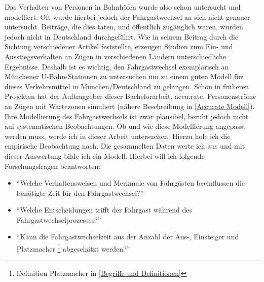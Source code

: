 Das Verhalten von Personen in Bahnhöfen wurde also schon untersucht und modelliert. Oft wurde hierbei jedoch der Fahrgastwechsel an sich nicht genauer untersucht. Beiträge, die dies taten, und öffentlich zugänglich waren, wurden jedoch nicht in Deutschland durchgeführt. Wie \cite{Zhang.2008} in seinem Beitrag durch die Sichtung verschiedener Artikel feststellte, erzeugen Studien zum Ein- und Ausstiegsverhalten an Zügen in verschiedenen Ländern unterschiedliche Ergebnisse.
Deshalb ist es wichtig, den Fahrgastwechsel exemplarisch an Münchener U-Bahn-Stationen zu untersuchen um zu einem guten Modell für dieses Verkehrsmittel in München/Deutschland zu gelangen.
Schon in früheren Projekten hat der Auftraggeber dieser Bachelorarbeit, accu:rate, Personenströme an Zügen mit Wartezonen simuliert (nähere Beschreibung in \ref{Accurate Modell}). Ihre Modellierung des Fahrgastwechsels ist zwar plausibel, beruht jedoch nicht auf systematischen Beobachtungen. Ob und wie diese Modellierung angepasst werden muss, werde ich in dieser Arbeit untersuchen. Hierzu hole ich die empirische Beobachtung nach. Die gesammelten Daten werte ich aus und mit dieser Auswertung bilde ich ein Modell. Hierbei will ich folgende Forschungsfragen beantworten:
\begin{itemize}
 \item "`Welche Verhaltensweisen und Merkmale von Fahrgästen beeinflussen die benötigte Zeit für den Fahrgastwechsel?"'
 \item "`Welche Entscheidungen trifft der Fahrgast während des Fahrgastwechselprozesses?"'
 \item "`Kann die Fahrgastwechselzeit aus der Anzahl der Aus-, Einsteiger und Platzmacher \footnote{Definition Platzmacher in \ref{Begriffe und Definitionen}} abgeschätzt werden?"'
\end{itemize}
